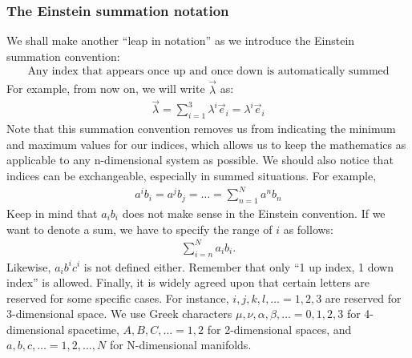 \documentclass{article}
\theoremstyle{definition}
\begin{document}
\subsubsection{The Einstein summation notation}
We shall make another ``leap in notation'' as we introduce the Einstein summation convention:
\begin{align*}
\boxed{\text{Any index that appears once up and once down is automatically summed}}
\end{align*}
For example, from now on, we will write $\vec{\lambda}$ as:
\begin{align*}
{\vec{\lambda}} = \sum_{i=1}^{3}\lambda^i\vec{e}_i = {\lambda^i\vec{e}_i}
\end{align*}
Note that this summation convention removes us from indicating the minimum and maximum values for our indices, which allows us to keep the mathematics as applicable to any n-dimensional system as possible. We should also notice that indices can be exchangeable, especially in summed situations. For example, 
\begin{align*}
\boxed{a^ib_i = a^jb_j = \dots = \sum_{n=1}^{N}a^nb_n}
\end{align*}
Keep in mind that $a_ib_i$ does not make sense in the Einstein convention. If we want to denote a sum, we have to specify the range of $i$ as follows:
\begin{align*}
\sum_{i=n}^{N}a_ib_i.
\end{align*} 
Likewise, $a_ib^ic^i$ is not defined either. Remember that only ``1 up index, 1 down index'' is allowed. Finally, it is widely agreed upon that certain letters are reserved for some specific cases. For instance, $i,j,k,l,\dots = 1,2,3$ are reserved for 3-dimensional space. We use Greek characters $\mu, \nu, \alpha, \beta,\dots = 0,1,2,3$ for 4-dimensional spacetime, $A,B,C,\dots = 1,2$ for 2-dimensional spaces, and $a,b,c,\dots = 1,2,\dots,N$ for N-dimensional manifolds. 
\end{document}
